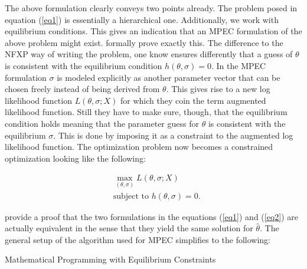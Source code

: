 The above formulation clearly conveys two points already. The problem posed in equation (\ref{eq1}) is essentially a hierarchical one. Additionally, we work with equilibrium conditions. This gives an indication that an MPEC formulation of the above problem might exist. \cite{Su.Judd.2012} formally prove exactly this. The difference to the NFXP way of writing the problem, one know ensures differently that a guess of $\theta$ is consistent with the equilibrium condition $h(\theta, \sigma)=0$. In the MPEC formulation $\sigma$ is modeled explicitly as another parameter vector that can be chosen freely instead of being derived from $\theta$. This gives rise to a new log likelihood function $L(\theta, \sigma; X)$ for which they coin the term augmented likelihood function. Still they have to make sure, though, that the equilibrium condition holds meaning that the parameter guess for $\theta$ is consistent with the equilibrium $\sigma$. This is done by imposing it as a constraint to the augmented log likelihood function. The optimization problem now becomes a constrained optimization looking like the following:

\begin{equation}
	\begin{aligned}
		& \max_{(\theta, \sigma)} L(\theta, \sigma; X) \\
		& \text{subject to } h(\theta, \sigma) = 0.
	\end{aligned}
	\label{eq2}
\end{equation}

\cite{Su.Judd.2012} provide a proof that the two formulations in the equations (\ref{eq1}) and (\ref{eq2}) are actually equivalent in the sense that they yield the same solution for $\hat\theta$. The general setup of the algorithm used for MPEC simplifies to the following:

\vspace{2ex}
\begin{algorithm}[H]
	\SetAlgoLined
	\;
	\caption{Mathematical Programming with Equilibrium Constraints}
\end{algorithm}
\vspace{2ex}
